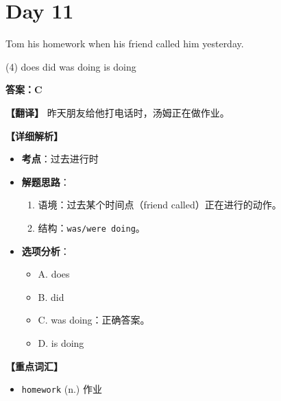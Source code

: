 \documentclass[11pt, a4paper]{article}
\newcommand{\analysis}[4]{
    \begin{solutionbox}
        \textbf{答案：#1}
        
        \textbf{【翻译】} #2
        
        \textbf{【详细解析】}
        #3
        
        \textbf{【重点词汇】}
        #4
    \end{solutionbox}
}
\newcommand{\blank}{\underline{\hspace{1.5cm}}}
\begin{document}
\section*{Day 11}
\begin{questions}
    \item Tom \blank his homework when his friend called him yesterday.
    \begin{tasks}(4)
        \task does \task did \task was doing \task is doing
    \end{tasks}
    \analysis{C}{昨天朋友给他打电话时，汤姆正在做作业。}{
        \begin{itemize}
            \item \textbf{考点}：过去进行时
            \item \textbf{解题思路}：
                \begin{enumerate}
                    \item 语境：过去某个时间点（friend called）正在进行的动作。
                    \item 结构：\texttt{was/were doing}。
                \end{enumerate}
            \item \textbf{选项分析}：
                \begin{itemize}
                    \item A. does
                    \item B. did
                    \item C. was doing：正确答案。
                    \item D. is doing
                \end{itemize}
        \end{itemize}
    }{
        \begin{itemize}
            \item \texttt{homework} (n.) 作业
        \end{itemize}
    }


\end{questions}
\end{document}
